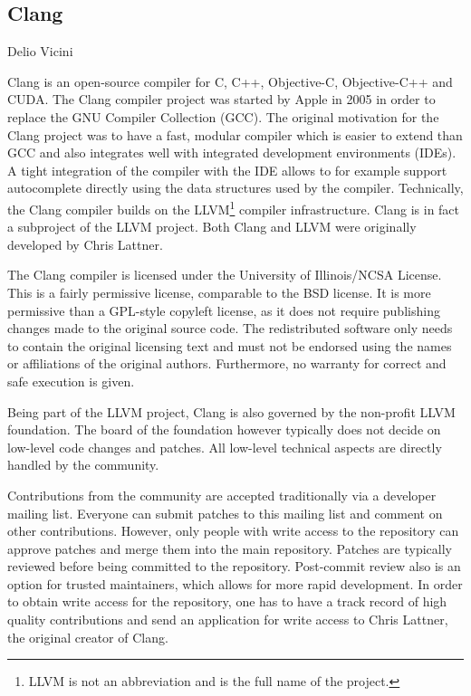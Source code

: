 \subsection{Clang}{Delio Vicini}

Clang is an open-source compiler for C, C++, Objective-C, Objective-C++ and CUDA. The Clang compiler project was started by Apple in 2005 in order to replace the GNU Compiler Collection (GCC). The original motivation for the Clang project was to have a fast, modular compiler which is easier to extend
than GCC and also integrates well with integrated development environments (IDEs).\cite{clang-motivation} A tight integration of the compiler with the IDE allows to for example support autocomplete directly using the data structures used by the compiler. Technically, the Clang compiler builds on the LLVM\footnote{LLVM is not an abbreviation and is the full name of the project.} compiler infrastructure. Clang is in fact a subproject of the LLVM project. Both Clang and LLVM were originally developed by Chris Lattner.\cite{lattner}

The Clang compiler is licensed under the University of Illinois/NCSA License.\cite{clang-policy} This is a fairly permissive license, comparable to the BSD license. It is more permissive than a GPL-style copyleft license, as it does not require publishing changes made to the original source code. The redistributed software only needs to contain the original licensing text and must 
not be endorsed using the names or affiliations of the original authors. Furthermore, no warranty for correct and safe execution is given.\cite{illinois-license}

Being part of the LLVM project, Clang is also governed by the non-profit LLVM foundation.\cite{llvm-foundation} The board of the foundation however typically does not decide on low-level code changes and patches. All low-level technical aspects are directly handled by the community.\cite{clang-policy}

Contributions from the community are accepted traditionally via a developer mailing list. Everyone can submit patches to this mailing list and comment on other contributions. However, only people with write access to the repository can approve patches and merge them into the main repository. Patches are typically reviewed before being committed to the repository. Post-commit review also is an option for trusted maintainers, which allows for more rapid development. In order to obtain write access for the repository, one has to have a track record of high quality contributions and send an application for write access to Chris Lattner, the original creator of Clang.

